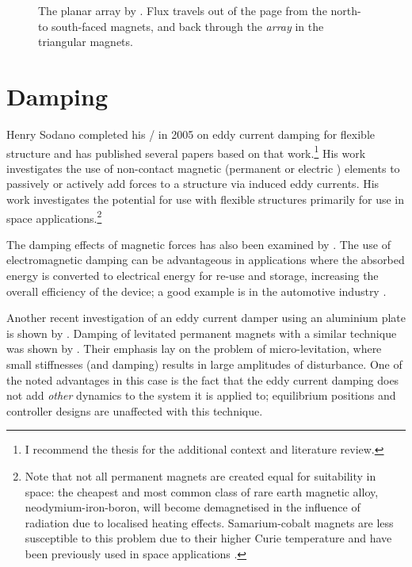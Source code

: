 \begin{figure}
   \caption[Novel planar array shown in the literature.]{%
     The planar array by \textcite{cho2001}. Flux travels out of the page 
     from the north- to south-faced magnets, and back through the \emph{array} 
     in the triangular magnets.}
\end{figure}



\section{Damping}

\cite{tentor2001}

Henry Sodano completed his \PhD/ in 2005 \cite{sodano2005thesis} on
eddy current damping for flexible structure and has published several
papers based on that work.\footnote{I recommend the thesis for the
  additional context and literature review.} His work investigates the
use of non-contact magnetic (permanent \cite{sodano2005,sodano2006,sodano2008} or
electric \cite{sodano2007}) elements to passively \cite{sodano2005} or
actively \cite{sodano2006,sodano2007,sodano2008} add forces to a structure via
induced eddy currents. His work investigates the potential for use
with flexible structures primarily for use in space
applications.\footnote{Note that not all permanent magnets are created
  equal for suitability in space: the cheapest and most common class
  of rare earth magnetic alloy, neodymium-iron-boron, will become
  demagnetised in the influence of radiation due to localised heating
  effects. Samarium-cobalt magnets are less susceptible to this
  problem due to their higher Curie temperature and have been
  previously used in space applications \cite{chen2005}.}

The damping effects of magnetic forces has also been examined by
\textcite{bonisoli2006}. The use of electromagnetic damping can be
advantageous in applications where the absorbed energy is converted to
electrical energy for re-use and storage, increasing the overall
efficiency of the device; a good example is in the automotive industry
\cite{graves2000thesis}. 

Another recent investigation of an eddy current damper using an aluminium
plate is shown by \textcite{ebrahimi2008}. Damping of levitated permanent
magnets with a similar technique was shown by \textcite{elbuken2006}. Their
emphasis lay on the problem of micro-levitation, where small stiffnesses (and
damping) results in large amplitudes of disturbance. One of the noted
advantages in this case is the fact that the eddy current damping does not add
\emph{other} dynamics to the system it is applied to; equilibrium positions
and controller designs are unaffected with this technique.


